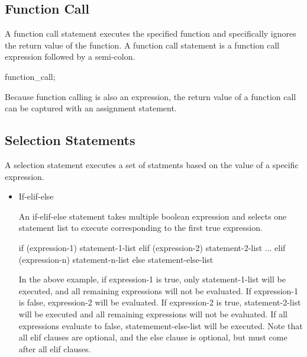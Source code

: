 \documentclass[oneside]{book}
\begin{document}
\subsection{Function Call}

A function call statement executes the specified function and specifically ignores the return value of the function. A function call statement is a function call expression followed by a semi-colon.
\begin{code}
function_call;
\end{code}
Because function calling is also an expression, the return value of a function call can be captured with an assignment statement.

\subsection{Selection Statements}

A selection statement executes a set of statments based on the value of a specific expression.

\begin{itemize}
\item If-elif-else

An if-elif-else statement takes multiple boolean expression and selects one statement list to execute corresponding to the first true expression. 

\begin{code}
if (expression-1)
{
  statement-1-list
}
elif (expression-2)
{
  statement-2-list
}
...
elif (expression-n)
{
  statement-n-list
}
else
{
  statement-else-list
}
\end{code}

In the above example, if expression-1 is true, only statement-1-list will be executed, and all remaining expressions will not be evaluated. If expression-1 is false, expression-2 will be evaluated. If expression-2 is true, statement-2-list will be executed and all remaining expressions will not be evaluated. If all expressions evaluate to false, statemement-else-list will be executed. Note that all elif clauses are optional, and the else clause is optional, but must come after all elif clauses.

\end{itemize}
\end{document}
